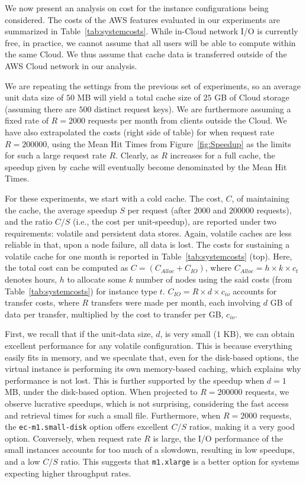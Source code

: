 We now present an analysis on cost for the instance configurations being
considered. The costs of the AWS features evaluated in our experiments are
summarized in Table~\ref{tab:systemcosts}. While in-Cloud network I/O is
currently free, in practice, we cannot assume that all users will be able to
compute within the same Cloud.  We thus assume that cache data is transferred
outside of the AWS Cloud network in our analysis.

We are repeating the settings from the previous set of experiments, so an
average unit data size of $50$ MB will yield a total cache size of $25$ GB of
Cloud storage (assuming there are $500$ distinct request keys). We are
furthermore assuming a fixed rate of $R = 2000$ requests per month from clients
outside the Cloud. We have also extrapolated the costs (right side of table)
for when request rate $R = 200000$, using the Mean Hit Times from
Figure~\ref{fig:Speedup} as the limits for such a large request rate $R$.
Clearly, as $R$ increases for a full cache, the speedup given by cache will
eventually become denominated by the Mean Hit Times.

For these experiments, we start with a cold cache.  The cost, $C$, of
maintaining the cache, the average speedup $S$ per request (after $2000$ and
$200000$ requests), and the ratio $C/S$ (i.e., the cost per unit-speedup), are
reported under two requirements: volatile and persistent data stores. Again,
volatile caches are less reliable in that, upon a node failure, all data is
lost. The costs for sustaining a volatile cache for one month is reported in
Table~\ref{tab:systemcosts} (top).  Here, the total cost can be computed as $C
= (C_{Alloc} + C_{IO})$, where $C_{Alloc} = h \times k \times c_t$ denotes
hours, $h$ to allocate some $k$ number of nodes using the said costs (from
Table~\ref{tab:systemcosts}) for instance type $t$. $C_{IO} = R \times d \times
c_{io}$ accounts for transfer costs, where $R$ transfers were made per month,
each involving $d$ GB of data per transfer, multiplied by the cost to transfer
per GB, $c_{io}$.

First, we recall that if the unit-data size, $d$, is very small ($1$ KB), we can
obtain excellent performance for any volatile configuration. This is because
everything easily fits in memory, and we speculate that, even for the
disk-based options, the virtual instance is performing its own
memory-based caching, which explains why performance is not lost. This is
further supported by the speedup when $d = 1$ MB, under the disk-based option.
When projected to $R = 200000$ requests, we observe lucrative speedups, which
is not surprising, considering the fast access and retrieval times for such a
small file. Furthermore, when $R = 2000$ requests, the {\tt ec-m1.small-disk} 
option offers excellent $C/S$ ratios, making it a very good option.
Conversely, when request rate $R$ is large, the I/O performance of the small
instances accounts for too much of a slowdown, resulting in low speedups, and
a low $C/S$ ratio. This suggests that {\tt m1.xlarge} is a better option for
systems expecting higher throughput rates.


